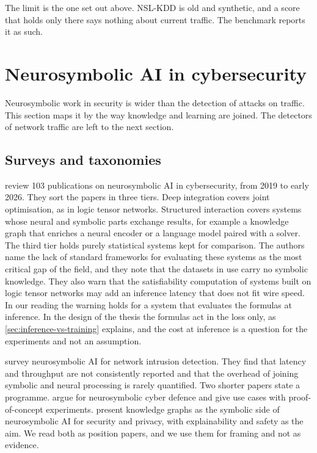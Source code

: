 The limit is the one set out above. NSL-KDD is old and synthetic, and a score
that holds only there says nothing about current traffic. The benchmark reports
it as such.

\section{Neurosymbolic AI in cybersecurity}
\label{sec:nesy-cybersecurity}

Neurosymbolic work in security is wider than the detection of attacks on
traffic. This section maps it by the way knowledge and learning are joined. The
detectors of network traffic are left to the next section.

\subsection{Surveys and taxonomies}
\label{sec:nesy-cyber-surveys}

\citet{hakim2025nesycybersecurity} review 103 publications on neurosymbolic AI
in cybersecurity, from 2019 to early 2026. They sort the papers in three tiers.
Deep integration covers joint optimisation, as in logic tensor networks.
Structured interaction covers systems whose neural and symbolic parts exchange
results, for example a knowledge graph that enriches a neural encoder or a
language model paired with a solver. The third tier holds purely statistical
systems kept for comparison. The authors name the lack of standard frameworks
for evaluating these systems as the most critical gap of the field, and they
note that the datasets in use carry no symbolic knowledge. They also warn that
the satisfiability computation of systems built on logic tensor networks may
add an inference latency that does not fit wire speed. In our reading the warning holds for a system that evaluates the formulas at
inference. In the design of the thesis the
formulas act in the loss only, as \cref{sec:inference-vs-training} explains, and
the cost at inference is a question for the experiments and not an assumption.

\citet{bizzarri2025survey} survey neurosymbolic AI for network intrusion
detection. They find that latency and throughput are not consistently reported
and that the overhead of joining symbolic and neural processing is rarely
quantified. Two shorter papers state a programme. \citet{grov2024neurosymbolic}
argue for neurosymbolic cyber defence and give use cases with proof-of-concept
experiments. \citet{piplai2023knowledge} present knowledge graphs as the
symbolic side of neurosymbolic AI for security and privacy, with explainability
and safety as the aim. We read both as position papers, and we use them for
framing and not as evidence.

